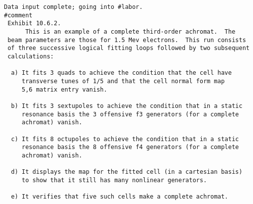 \begin{footnotesize}
\begin{verbatim}
Data input complete; going into #labor.
#comment
 Exhibit 10.6.2.
      This is an example of a complete third-order achromat.  The
 beam parameters are those for 1.5 Mev electrons.  This run consists
 of three successive logical fitting loops followed by two subsequent
 calculations:

  a) It fits 3 quads to achieve the condition that the cell have
     transverse tunes of 1/5 and that the cell normal form map
     5,6 matrix entry vanish.

  b) It fits 3 sextupoles to achieve the condition that in a static
     resonance basis the 3 offensive f3 generators (for a complete
     achromat) vanish.

  c) It fits 8 octupoles to achieve the condition that in a static
     resonance basis the 8 offensive f4 generators (for a complete
     achromat) vanish.

  d) It displays the map for the fitted cell (in a cartesian basis)
     to show that it still has many nonlinear generators.

  e) It verifies that five such cells make a complete achromat.


\end{verbatim}
\end{footnotesize}
